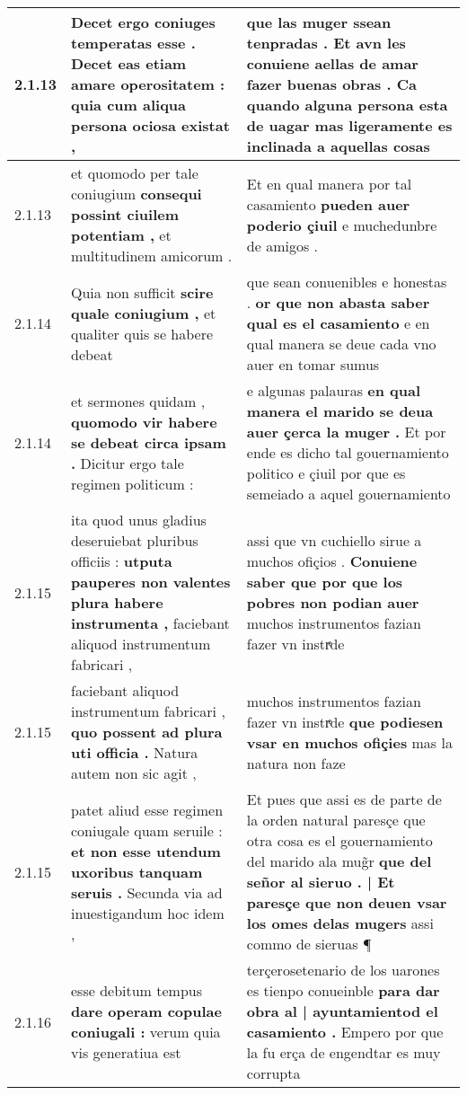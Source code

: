 \begin{tabular}{|p{1cm}|p{6.5cm}|p{6.5cm}|}
2.1.13 & Decet ergo coniuges temperatas esse . \textbf{ Decet eas etiam amare operositatem : } quia cum aliqua persona ociosa existat , & que las muger ssean tenpradas . \textbf{ Et avn les conuiene aellas de amar fazer buenas obras . } Ca quando alguna persona esta de uagar mas ligeramente es inclinada a aquellas cosas \\\hline
2.1.13 & et quomodo per tale coniugium \textbf{ consequi possint ciuilem potentiam , } et multitudinem amicorum . & Et en qual manera por tal casamiento \textbf{ pueden auer poderio çiuil } e muchedunbre de amigos . \\\hline
2.1.14 & Quia non sufficit \textbf{ scire quale coniugium , } et qualiter quis se habere debeat & que sean conuenibles e honestas . \textbf{ or que non abasta saber qual es el casamiento } e en qual manera se deue cada vno auer en tomar sumus \\\hline
2.1.14 & et sermones quidam , \textbf{ quomodo vir habere se debeat circa ipsam . } Dicitur ergo tale regimen politicum : & e algunas palauras \textbf{ en qual manera el marido se deua auer çerca la muger . } Et por ende es dicho tal gouernamiento politico e çiuil por que es semeiado a aquel gouernamiento \\\hline
2.1.15 & ita quod unus gladius deseruiebat pluribus officiis : \textbf{ utputa pauperes non valentes plura habere instrumenta , } faciebant aliquod instrumentum fabricari , & assi que vn cuchiello sirue a muchos ofiçios . \textbf{ Conuiene saber que por que los pobres non podian auer } muchos instrumentos fazian fazer vn instrͤde \\\hline
2.1.15 & faciebant aliquod instrumentum fabricari , \textbf{ quo possent ad plura uti officia . } Natura autem non sic agit , & muchos instrumentos fazian fazer vn instrͤde \textbf{ que podiesen vsar en muchos ofiçies } mas la natura non faze \\\hline
2.1.15 & patet aliud esse regimen coniugale quam seruile : \textbf{ et non esse utendum uxoribus tanquam seruis . } Secunda via ad inuestigandum hoc idem , & Et pues que assi es de parte de la orden natural paresçe que otra cosa es el gouernamiento del marido ala mug̃r \textbf{ que del señor al sieruo . | Et paresçe que non deuen vsar los omes delas mugers } assi commo de sieruas ¶ \\\hline
2.1.16 & esse debitum tempus \textbf{ dare operam copulae coniugali : } verum quia vis generatiua est & terçerosetenario de los uarones es tienpo conueinble \textbf{ para dar obra al | ayuntamientod el casamiento . } Empero por que la fu erça de engendtar es muy corrupta \\\hline

\end{tabular}
